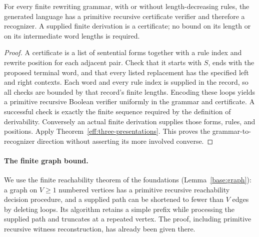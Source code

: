 \begin{proposition}
\label{eff:grammar-recognizable}
For every finite rewriting grammar, with or without length-decreasing rules,
the generated language has a primitive recursive certificate verifier and
therefore a recognizer.  A supplied finite derivation is a certificate;
no bound on its length or on its intermediate word lengths is required.
\end{proposition}
\begin{proof}
A certificate is a list of sentential forms together with a rule index and
rewrite position for each adjacent pair.  Check that it starts with $S$,
ends with the proposed terminal word, and that every listed replacement
has the specified left and right contexts.  Each word and every rule index
is supplied in the record, so all checks are bounded by that record's
finite lengths.  Encoding these loops yields a primitive recursive Boolean
verifier uniformly in the grammar and certificate.  A successful check is
exactly the finite sequence required by the definition of derivability.
Conversely an actual finite derivation supplies those forms, rules, and
positions.  Apply Theorem~\ref{eff:three-presentations}.  This proves the
grammar-to-recognizer direction without asserting its more involved converse.
\end{proof}

\paragraph{The finite graph bound.}
We use the finite reachability theorem of the foundations
(Lemma~\ref{base:graph}): a graph on $V\geq1$ numbered vertices has a
primitive recursive reachability decision procedure, and a supplied path
can be shortened to fewer than $V$ edges by deleting loops.  Its algorithm
retains a simple prefix while processing the supplied path and truncates
at a repeated vertex.  The proof, including primitive recursive witness
reconstruction, has already been given there.

